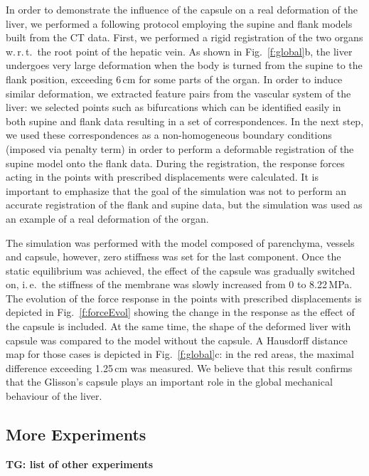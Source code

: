 \documentclass[final,3p,times,twocolumn]{elsarticle}
\def\wrt{w.\,r.\,t.\ }
\def\ie{i.\,e.\ }
\newcommand{\TG}[1]{{\color{blue}\textbf{TG: #1}}}
\begin{document}
In order to demonstrate the influence of the capsule on a real deformation of the liver, we 
performed a following protocol employing the supine and flank models built from the CT data. 
First, we performed a rigid registration of the two organs \wrt the root point of the hepatic vein. 
As shown in Fig.~\ref{f:global}b, the liver undergoes very large deformation when the body 
is turned from the supine to the flank position, exceeding 6\,cm for some parts of the organ. 
In order to induce similar deformation, we extracted feature pairs from the vascular system of the liver:
we selected points such as bifurcations which can be identified easily in both supine and flank 
data resulting in a set of correspondences. In the next step, we used these correspondences as a non-homogeneous
boundary conditions (imposed via penalty term) in order to perform a deformable registration of the supine
model onto the flank data. During the registration, the response forces acting in the points with prescribed displacements
were calculated. It is important to emphasize that the goal of the simulation was not 
to perform an accurate registration of the flank and supine data, but the simulation was used 
as an example of a real deformation of the organ.

The simulation was performed with the model composed of parenchyma,  vessels and capsule, however, zero stiffness was 
set for the last component.
Once the static equilibrium was achieved, the effect of the capsule was gradually switched 
on, \ie the stiffness of the membrane was slowly increased from 0 to 8.22\,MPa. The evolution of the force response in the 
points with prescribed displacements is depicted in Fig.~\ref{f:forceEvol} showing the change in the response as the effect
of the capsule is included. At the same time, the shape of the deformed liver with capsule was compared 
to the model without the capsule. A Hausdorff distance map for those cases is depicted in Fig.~\ref{f:global}c: in the red areas, the 
maximal difference exceeding 1.25\,cm was measured. We believe that this result confirms that the Glisson's capsule 
plays an important role in the global mechanical behaviour of the liver.


\subsection{More Experiments}

\TG{list of other experiments}
\end{document}
